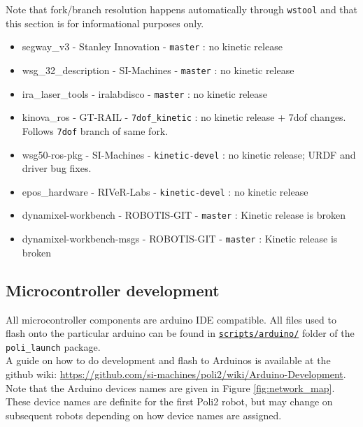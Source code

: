 Note that fork/branch resolution happens automatically through \texttt{wstool} and that this section is for informational purposes only.

\begin{itemize}
   \item segway\_v3 - Stanley Innovation - \texttt{master} : no kinetic release
   \item wsg\_32\_description - SI-Machines - \texttt{master} : no kinetic release
   \item ira\_laser\_tools - iralabdisco - \texttt{master} : no kinetic release
   \item kinova\_ros - GT-RAIL - \texttt{7dof\_kinetic} : no kinetic release + 7dof changes. Follows \texttt{7dof} branch of same fork.
   \item wsg50-ros-pkg - SI-Machines - \texttt{kinetic-devel} : no kinetic release; URDF and driver bug fixes.
   \item epos\_hardware - RIVeR-Labs - \texttt{kinetic-devel} : no kinetic release
   \item dynamixel-workbench - ROBOTIS-GIT - \texttt{master} : Kinetic release is broken
   \item dynamixel-workbench-msgs - ROBOTIS-GIT - \texttt{master} : Kinetic release is broken
\end{itemize}

\subsection{Microcontroller development}
All microcontroller components are arduino IDE compatible. 
All files used to flash onto the particular arduino can be found in \href{https://github.com/si-machines/poli2/tree/master/poli_launch/scripts/arduino}{\texttt{scripts/arduino/}} folder of the \texttt{poli\_launch} package. \\

A guide on how to do development and flash to Arduinos is available at the github wiki: \href{https://github.com/si-machines/poli2/wiki/Arduino-Development}{https://github.com/si-machines/poli2/wiki/Arduino-Development}. \\

Note that the Arduino devices names are given in Figure \ref{fig:network_map}. These device names are definite for the first Poli2 robot, but may change on subsequent robots depending on how device names are assigned.



